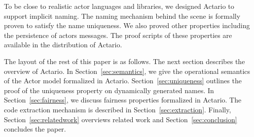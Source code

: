 To be close to realistic actor languages and libraries, we designed
Actario to support implicit naming. The naming mechanism behind the
scene is formally proven to satisfy the name uniqueness.  We also
proved other properties including the persistence of actors messages.
The proof scripts of these properties are available in the
distribution of Actario\cite{Actario}.






The layout of the rest of this paper is as follows.
The next section describes the overview of Actario.
In Section~\ref{sec:semantics}, we give the operational semantics of the Actor model formalized in Actario.
Section~\ref{sec:uniqueness} outlines the proof of the uniqueness property on dynamically generated names.
In Section~\ref{sec:fairness}, we discuss fairness properties formalized in Actario.
The code extraction mechanism is described in Section~\ref{sec:extraction}.
Finally, Section~\ref{sec:relatedwork} overviews related work and Section~\ref{sec:conclusion} concludes the paper.

